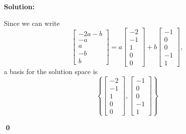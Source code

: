 \documentclass{article}
\newenvironment{solution}
{
	\ignorespaces
	\textbf{Solution:}
}
{
	\ignorespacesafterend
	\begin{flushright}
	{\bfseries \qed}
	\end{flushright}
}
\begin{document}
\begin{solution}
Since we can write \[\begin{bmatrix} -2a-b \\ -a \\ a \\ -b \\ b \end{bmatrix} = a \begin{bmatrix} -2 \\ -1 \\ 1 \\ 0 \\ 0 \end{bmatrix} + b \begin{bmatrix} -1 \\ 0 \\ 0 \\ -1 \\ 1 \end{bmatrix}, \]
a basis for the solution space is 
\[ \left \{ \begin{bmatrix} -2 \\ -1 \\ 1 \\ 0 \\ 0 \end{bmatrix} , \begin{bmatrix} -1 \\ 0 \\ 0 \\ -1 \\ 1 \end{bmatrix} \right\}\]
\end{solution}
\end{document}
